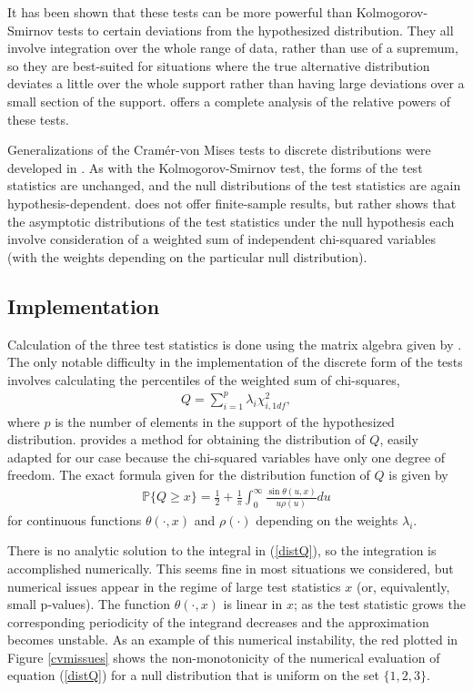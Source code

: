 It has been shown that these tests can be more powerful than Kolmogorov-Smirnov tests to certain deviations from the hypothesized distribution. 
They all involve integration over the whole range of data, rather than
use of a supremum, so they are best-suited for situations where the
true alternative distribution deviates a little over the whole support
rather than having large deviations over a small section of the support. 
\cite{stephens1974} offers a complete analysis of the relative powers
of these tests.


Generalizations of the Cram\'{e}r-von Mises tests to discrete
distributions were developed in \cite{choulakian1994}. As with the
Kolmogorov-Smirnov test, the forms of the test statistics are unchanged, 
and the null distributions of the test statistics are again hypothesis-dependent. \cite{choulakian1994} does not offer finite-sample results, but rather 
shows that the asymptotic distributions of the test statistics under the null hypothesis each involve consideration of a weighted sum of independent
chi-squared variables (with the weights depending on the particular
null distribution). 


\subsection{Implementation}

Calculation of the three test statistics is done using the
matrix algebra given by \cite{choulakian1994}. 
The only notable difficulty in the implementation of the discrete form
of the tests involves calculating the percentiles
of the weighted sum of chi-squares,
\begin{align}
Q = \sum_{i=1}^{p} \lambda_i \chi^2_{i,1df},   \label{eqQ}
\end{align}
where $p$ is the number of elements in the support of the hypothesized
distribution.
\cite{imhof1961} provides a method for obtaining the distribution of $Q$,
easily adapted for our case because
the chi-squared variables have only one degree of freedom.
The exact formula given for the distribution function of $Q$
is given by
\begin{align}
\mathbb{P}\{Q \geq x \} = \frac{1}{2} + 
\frac{1}{\pi} \int_{0}^{\infty} \frac{\sin\theta(u,x)}{u \rho(u) } du
\label{distQ}
\end{align}
for continuous functions $\theta(\cdot, x)$ and $\rho(\cdot)$ depending on the  weights $\lambda_i$. 

There is no analytic solution to the integral in (\ref{distQ}), 
so the integration is
accomplished numerically. This seems fine in most situations we considered,
but numerical issues appear in the regime of large test statistics $x$
(or, equivalently, small p-values).
The function $\theta(\cdot, x)$ is linear in $x$; as the test statistic 
grows the corresponding periodicity of the integrand decreases and
the approximation becomes unstable. 
As an example of this numerical instability, the red plotted in
Figure \ref{cvmissues} shows the non-monotonicity of the numerical
evaluation of equation (\ref{distQ}) for a null distribution that is
uniform on the set $\{1,2,3\}$.


